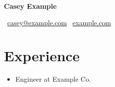 \documentclass[11pt,a4paper]{article}
\begin{document}
{\LARGE\bfseries Casey Example}\par
\faEnvelope\ \href{mailto:casey@example.com}{casey@example.com} \quad \faGlobe\ \href{https://example.com}{example.com}
\section*{Experience}
\begin{itemize}[leftmargin=*]
\item Engineer at Example Co.
\end{itemize}
\end{document}
